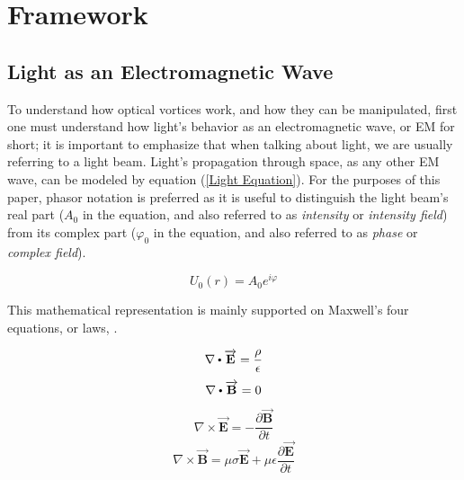 \chapter{Framework} 
\label{Framework} %

\section{Light as an Electromagnetic Wave} 
\label{Light is an EM Wave}

To understand how optical vortices work, and how they can be manipulated, first one must understand how light's behavior as an electromagnetic wave, or EM for short; it is important to emphasize that when talking about light, we are usually referring to a light beam. Light's propagation through space, as any other EM wave, can be modeled by equation (\ref{Light Equation}). For the purposes of this paper, phasor notation is preferred as it is useful to distinguish the light beam's real part ($A_0$ in the equation, and also referred to as \textit{intensity} or \textit{intensity field}) from its complex part ($\varphi_0$ in the equation, and also referred to as \textit{phase} or \textit{complex field}).

\begin{equation}
    U_0(r) = A_0e^{i\varphi}
    \label{Light Equation}
\end{equation}

This mathematical representation is mainly supported on Maxwell's four equations, or laws, \cite{Hecht_Optics-Appendix1}.

\begin{equation}
    \nabla \bigcdot \overrightarrow{\textbf{E}} = \frac{\rho}{\epsilon}
    \label{Gauss' Law for Electric Fields}
\end{equation}
\begin{equation}
    \nabla \bigcdot \overrightarrow{\textbf{B}} = 0
    \label{Gauss' Law for Magnetic Fields}
\end{equation}
\begin{equation}
    \nabla \times \overrightarrow{\textbf{E}} = -\frac{\partial \overrightarrow{\textbf{B}}}{\partial t}
    \label{Faraday's Law}
\end{equation}
\begin{equation}
    \nabla \times \overrightarrow{\textbf{B}} = \mu\sigma\overrightarrow{\textbf{E}}+\mu\epsilon\frac{\partial\overrightarrow{\textbf{E}}}{\partial t}
    \label{Ampere's Law}
\end{equation}

